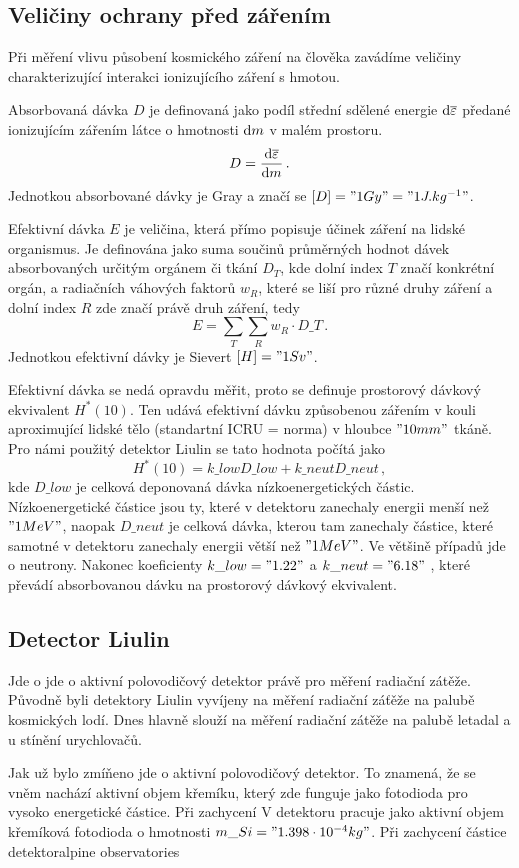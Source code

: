 \documentclass[12pt,a4paper]{article}
\begin{document}
\subsection*{Veličiny ochrany před zářením}
Při měření vlivu působení kosmického záření na člověka zavádíme veličiny charakterizující interakci
ionizujícího záření s hmotou.\par
Absorbovaná dávka $D$ je definovaná jako podíl střední sdělené energie $\mathrm{d} \overline{\varepsilon}$ předané ionizujícím
zářením látce o hmotnosti $\mathrm{d} m$ v malém prostoru.
$$D=\frac{\mathrm{d} \overline{\varepsilon}}{\mathrm{d} m}\,.$$
Jednotkou absorbované dávky je Gray a značí se ${[D]="1 Gy"="1 J.kg^{-1}"}$.\par
Efektivní dávka $E$ je veličina, která přímo popisuje účinek záření na lidské organismus. Je definována
jako suma součinů průměrných hodnot dávek absorbovaných určitým orgánem či tkání $D_T$, kde dolní index
$T$ značí konkrétní orgán, a radiačních váhových faktorů $w_R$, které se liší pro různé druhy záření a dolní
index $R$ zde značí právě druh záření, tedy
$$E=\sum_{T}\sum_{R} w_R\cdot D\_{T}\,.$$
Jednotkou efektivní dávky je Sievert ${[H]="1 Sv"}$.\par
Efektivní dávka se nedá opravdu měřit, proto se definuje prostorový dávkový ekvivalent $ H^\ast(10) $. Ten
udává efektivní dávku způsobenou zářením v kouli aproximující lidské tělo (standartní ICRU = norma) v
hloubce $"10 mm"$ tkáně. Pro námi použitý detektor Liulin se tato hodnota počítá jako
$$H^\ast(10)=k\_{low}D\_{low}+k\_{neut}D\_{neut}\,,$$
kde $D\_{low}$ je celková deponovaná dávka nízkoenergetických částic. Nízkoenergetické částice jsou ty,
které v detektoru zanechaly energii menší než $ "1 MeV" $, naopak $ D\_{neut} $ je celková dávka, kterou
tam zanechaly částice, které samotné v detektoru zanechaly energii větší než $ "1 MeV" $. Ve většině
případů jde o neutrony. Nakonec koeficienty $ k\_{low}="1.22" $ a $ k\_{neut}="6.18" $ , které převádí
absorbovanou dávku na prostorový dávkový ekvivalent.\par
\subsection*{Detector Liulin}

Jde o jde o aktivní polovodičový detektor právě pro měření radiační zátěže. Původně byli detektory Liulin
vyvíjeny na měření radiační záťěže na palubě kosmických lodí. Dnes hlavně slouží na měření radiační
zátěže na palubě letadal a u stínění urychlovačů.\par
Jak už bylo zmíňeno jde o aktivní polovodičový detektor. To znamená, že se vněm nachází aktivní objem
křemíku, který zde funguje jako fotodioda pro vysoko energetické částice. Při zachycení   V detektoru pracuje jako
aktivní objem křemíková fotodioda o hmotnosti $m\_{Si}="1.398\cdot 10^{-4} kg"$. Při zachycení částice
detektoralpine observatories
\end{document}
